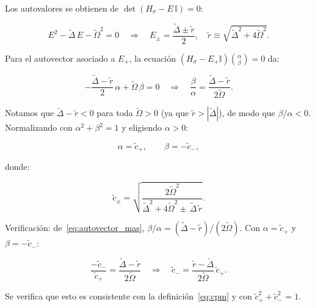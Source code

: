\documentclass[12pt]{article}
\begin{document}
\noindent
Los autovalores se obtienen de $\det(H_\sigma - E\,\mathbb{I}) = 0$:

\begin{equation}
	E^2 - \widetilde\Delta\,E - \widetilde\Omega^2 = 0
	\quad\Longrightarrow\quad
	E_\pm = \frac{\widetilde\Delta \pm \tilde{r}}{2},
	\quad
	\tilde{r} \equiv \sqrt{\widetilde\Delta^2 + 4\widetilde\Omega^2}.
	\label{eq:autovalores}
\end{equation}

\noindent
Para el autovector asociado a $E_+$, la ecuaci\'on
$(H_\sigma - E_+\mathbb{I})\binom{\alpha}{\beta} = 0$ da:

\begin{equation}
	-\frac{\widetilde\Delta - \tilde{r}}{2}\,\alpha + \widetilde\Omega\,\beta = 0
	\quad\Longrightarrow\quad
	\frac{\beta}{\alpha} = \frac{\widetilde\Delta - \tilde{r}}{2\widetilde\Omega}.
	\label{eq:autovector_mas}
\end{equation}

\noindent
Notamos que $\widetilde\Delta - \tilde{r} < 0$ para toda
$\widetilde\Omega > 0$ (ya que $\tilde{r} > |\widetilde\Delta|$),
de modo que $\beta/\alpha < 0$. Normalizando con
$\alpha^2 + \beta^2 = 1$ y eligiendo $\alpha > 0$:

\begin{equation}
	\alpha = \tilde{c}_+, \qquad \beta = -\tilde{c}_-,
\end{equation}

donde:

\begin{equation}
	\tilde{c}_\pm = \sqrt{\frac{2\widetilde\Omega^2}
		{\widetilde\Delta^2 + 4\widetilde\Omega^2
			\pm\, \widetilde\Delta\,\tilde{r}}}.
	\label{eq:cpm}
\end{equation}

\noindent
Verificaci\'on: de~\eqref{eq:autovector_mas},
$\beta/\alpha = (\widetilde\Delta - \tilde{r})/(2\widetilde\Omega)$.
Con $\alpha = \tilde{c}_+$ y $\beta = -\tilde{c}_-$:

\begin{equation}
	\frac{-\tilde{c}_-}{\tilde{c}_+}
	= \frac{\widetilde\Delta - \tilde{r}}{2\widetilde\Omega}
	\quad\Longrightarrow\quad
	\tilde{c}_- = \frac{\tilde{r} - \widetilde\Delta}{2\widetilde\Omega}\,\tilde{c}_+.
	\label{eq:ratio_cpm}
\end{equation}

\noindent
Se verifica que esto es consistente con la definici\'on~\eqref{eq:cpm}
y con $\tilde{c}_+^2 + \tilde{c}_-^2 = 1$.
\end{document}
